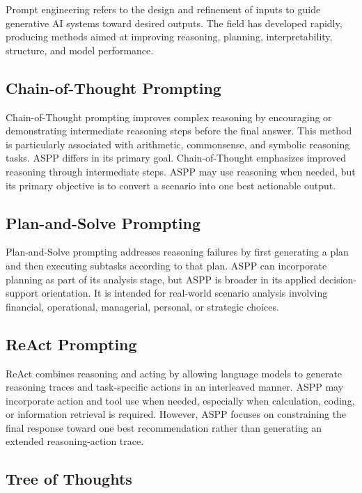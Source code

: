 \documentclass[11pt]{article}
\begin{document}
Prompt engineering refers to the design and refinement of inputs to guide generative AI systems toward desired outputs. The field has developed rapidly, producing methods aimed at improving reasoning, planning, interpretability, structure, and model performance.

\subsection{Chain-of-Thought Prompting}

Chain-of-Thought prompting improves complex reasoning by encouraging or demonstrating intermediate reasoning steps before the final answer. This method is particularly associated with arithmetic, commonsense, and symbolic reasoning tasks. ASPP differs in its primary goal. Chain-of-Thought emphasizes improved reasoning through intermediate steps. ASPP may use reasoning when needed, but its primary objective is to convert a scenario into one best actionable output.

\subsection{Plan-and-Solve Prompting}

Plan-and-Solve prompting addresses reasoning failures by first generating a plan and then executing subtasks according to that plan. ASPP can incorporate planning as part of its analysis stage, but ASPP is broader in its applied decision-support orientation. It is intended for real-world scenario analysis involving financial, operational, managerial, personal, or strategic choices.

\subsection{ReAct Prompting}

ReAct combines reasoning and acting by allowing language models to generate reasoning traces and task-specific actions in an interleaved manner. ASPP may incorporate action and tool use when needed, especially when calculation, coding, or information retrieval is required. However, ASPP focuses on constraining the final response toward one best recommendation rather than generating an extended reasoning-action trace.

\subsection{Tree of Thoughts}
\end{document}
